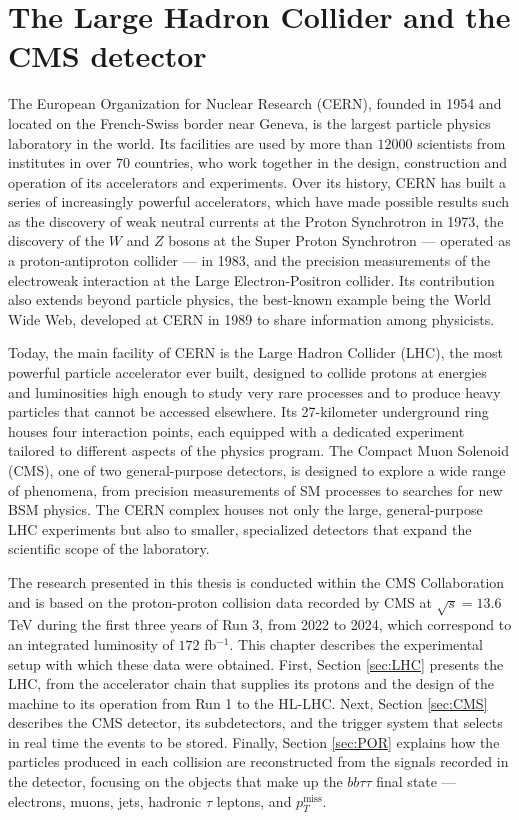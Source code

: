 \chapter{The Large Hadron Collider and the CMS detector}
\label{ch:LHC_CMS}
%
The European Organization for Nuclear Research (CERN), founded in 1954 and located on the French-Swiss border near Geneva, is the largest particle physics laboratory in the world. Its facilities are used by more than $12000$ scientists from institutes in over $70$ countries, who work together in the design, construction and operation of its accelerators and experiments. Over its history, CERN has built a series of increasingly powerful accelerators, which have made possible results such as the discovery of weak neutral currents at the Proton Synchrotron in 1973, the discovery of the $W$ and $Z$ bosons at the Super Proton Synchrotron — operated as a proton-antiproton collider — in 1983, and the precision measurements of the electroweak interaction at the Large Electron-Positron collider. Its contribution also extends beyond particle physics, the best-known example being the World Wide Web, developed at CERN in 1989 to share information among physicists.

Today, the main facility of CERN is the Large Hadron Collider (LHC), the most powerful particle accelerator ever built, designed to collide protons at energies and luminosities high enough to study very rare processes and to produce heavy particles that cannot be accessed elsewhere. Its 27-kilometer underground ring houses four interaction points, each equipped with a dedicated experiment tailored to different aspects of the physics program. The Compact Muon Solenoid (CMS), one of two general-purpose detectors, is designed to explore a wide range of phenomena, from precision measurements of SM processes to searches for new BSM physics. The CERN complex houses not only the large, general-purpose LHC experiments but also to smaller, specialized detectors that expand the scientific scope of the laboratory. 

The research presented in this thesis is conducted within the CMS Collaboration and is based on the proton-proton collision data recorded by CMS at $\sqrt{s}=13.6$ TeV during the first three years of Run 3, from 2022 to 2024, which correspond to an integrated luminosity of $172$ fb$^{-1}$. This chapter describes the experimental setup with which these data were obtained. First, Section \ref{sec:LHC} presents the LHC, from the accelerator chain that supplies its protons and the design of the machine to its operation from Run 1 to the HL-LHC. Next, Section \ref{sec:CMS} describes the CMS detector, its subdetectors, and the trigger system that selects in real time the events to be stored. Finally, Section \ref{sec:POR} explains how the particles produced in each collision are reconstructed from the signals recorded in the detector, focusing on the objects that make up the $bb\tau\tau$ final state — electrons, muons, jets, hadronic $\tau$ leptons, and $p_T^\text{miss}$.



